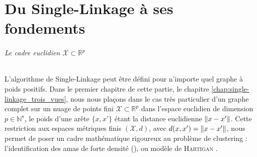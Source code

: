 \documentclass{these-ISSS} %
\makeatletter
\providecommand{\cleartorecto}{\cleardoublepage}
\renewcommand\frontmatter{%
  \@mainmatterfalse
  \@intablestrue
  \pagenumbering{roman}%
  \pagestyle{fancy}%
  \lhead[\thepage]{\rightmark}%
  \rhead[\leftmark]{\thepage}%
  \lfoot[]{}\rfoot[]{}\cfoot[]{}%
}
\makeatother
\begin{document}
\frontmatter
\AjouterRenvoisIndexNoms

{\hfuzz=100pt\vfuzz=100pt\maketitle}

\cleartorecto


\cleartorecto
%

\SansIndex{\tableofcontents}

\cleartorecto


\cleartorecto
\mainmatter


% 








\part{Du Single-Linkage à ses fondements}

\paragraph{Le cadre euclidien $\mathcal X \subset \mathbb R^p$}
L'algorithme de Single-Linkage \cite{DendriteSingleLinkage1951, GowerRoss1969} peut être défini pour n'importe quel graphe à poids positifs. Dans le premier chapitre de cette partie, le chapitre \ref{chap:single-linkage_trois_vues}, nous nous plaçons dans le cas très particulier d'un graphe complet sur un nuage de points fini $\mathcal X \subset \mathbb R^p$ dans l'espace euclidien de dimension $p\in \mathbb N^\star$, le poids d'une arête $\bigl\{x,x'\bigr\}$ étant la distance euclidienne $\lVert x-x' \rVert$. Cette restriction aux espaces métriques finis $(\mathcal X, d)$, avec $d(x,x') = \lVert x-x' \rVert$, nous permet de poser un cadre mathématique rigoureux au problème de clustering : l'identification des amas de forte densité (), ou modèle de \textsc{Hartigan} \cite{hartigan81, penrose2003}. 
\end{document}

